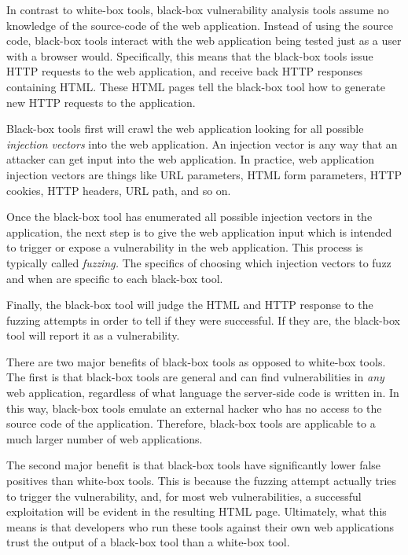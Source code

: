 In contrast to white-box tools, black-box vulnerability analysis tools
assume no knowledge of the source-code of the web application. Instead
of using the source code, black-box tools interact with the web
application being tested just as a user with a browser would.
Specifically, this means that the black-box tools issue HTTP requests
to the web application, and receive back HTTP responses containing
HTML. These HTML pages tell the black-box tool how to generate new
HTTP requests to the application. 

Black-box tools first will crawl the web application looking for all
possible \emph{injection vectors} into the web application. An
injection vector is any way that an attacker can get input into the
web application. In practice, web application injection vectors are
things like URL parameters, HTML form parameters, HTTP cookies, HTTP
headers, URL path, and so on. 

Once the black-box tool has enumerated all possible injection vectors
in the application, the next step is to give the web application input
which is intended to trigger or expose a vulnerability in the web
application. This process is typically called \emph{fuzzing.} The
specifics of choosing which injection vectors to fuzz and when are
specific to each black-box tool. 

Finally, the black-box tool will judge the HTML and HTTP response to
the fuzzing attempts in order to tell if they were successful. If they
are, the black-box tool will report it as a vulnerability. 

There are two major benefits of black-box tools as opposed to
white-box tools. The first is that black-box tools are general and can
find vulnerabilities in \emph{any} web application, regardless of what
language the server-side code is written in. In this way, black-box
tools emulate an external hacker who has no access to the source code
of the application. Therefore, black-box tools are applicable to a
much larger number of web applications. 

The second major benefit is that black-box tools have significantly
lower false positives than white-box tools. This is because the
fuzzing attempt actually tries to trigger the vulnerability, and, for
most web vulnerabilities, a successful exploitation will be evident in
the resulting HTML page. Ultimately, what this means is that
developers who run these tools against their own web applications
trust the output of a black-box tool than a white-box tool. 

